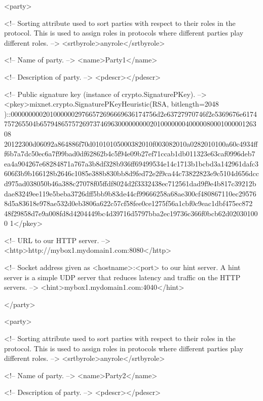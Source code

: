    <party>

      <!-- Sorting attribute used to sort parties with respect to their 
           roles in the protocol. This is used to assign roles in 
           protocols where different parties play different roles. -->
      <srtbyrole>anyrole</srtbyrole>

      <!-- Name of party. -->
      <name>Party1</name>

      <!-- Description of party. -->
      <pdescr></pdescr>

      <!-- Public signature key (instance of crypto.SignaturePKey). -->
      <pkey>mixnet.crypto.SignaturePKeyHeuristic(RSA, bitlength=2048
)::00000000020100000029766572696669636174756d2e63727970746f2e5369676e6174
757265504b657948657572697374696300000000020100000004000008000100000126308
20122300d06092a864886f70d01010105000382010f003082010a0282010100a60c4934ff
f6b7a7dc50ec6a7f99bad0df62862b4c5f94e09b27ef71ccab1db011323e63caf0996deb7
ea4a904267e68284871a767a3b8df328b936ff69499534e14c1713b1bcbd3a142961dafc3
606f3b9b166128b2646c1085e388b830bb8d9fed72e2f9ca44c73822823e9c5104d656dcc
d975ad038050b46a388c27078f05ffdf8024d2f3332438ec712561dad9f9e4b817c39212b
dae83249ee119e5beba3726dff5bb9b83de44cf99666258a68ae300cf480867110ec29576
8d5a83618e978ae532d0eb3806a622c57cf58fee0ce1275f56a1cbf0c9eac1dbf475ec872
48f29858d7e9a008fd8d4204449bc4d39716d5797bba2ec19736c366f0bcb62d020301000
1</pkey>

      <!-- URL to our HTTP server. -->
      <http>http://mybox1.mydomain1.com:8080</http>

      <!-- Socket address given as <hostname>:<port> to our hint server. 
           A hint server is a simple UDP server that reduces latency and 
           traffic on the HTTP servers. -->
      <hint>mybox1.mydomain1.com:4040</hint>

   </party>

   <party>

      <!-- Sorting attribute used to sort parties with respect to their 
           roles in the protocol. This is used to assign roles in 
           protocols where different parties play different roles. -->
      <srtbyrole>anyrole</srtbyrole>

      <!-- Name of party. -->
      <name>Party2</name>

      <!-- Description of party. -->
      <pdescr></pdescr>

